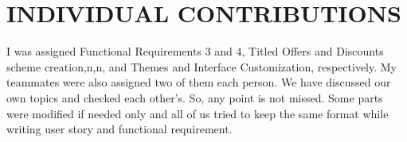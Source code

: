 \chapter{INDIVIDUAL CONTRIBUTIONS} \label{ch:data}
I was assigned Functional Requirements 3 and 4, Titled Offers and Discounts scheme creation,n,n, and Themes and Interface Customization, respectively. My teammates were also assigned two of them each person. We have discussed our own topics and checked each other's. So, any point is not missed. Some parts were modified if needed only and all of us tried to keep the same format while writing user story and functional requirement.